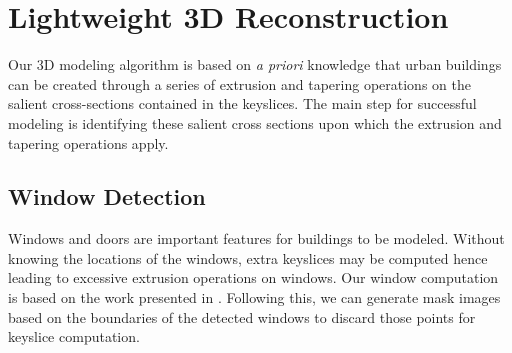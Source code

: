 \documentclass[10pt,twocolumn,letterpaper]{article}
\begin{document}
% 
% 
% 

\section{Lightweight 3D Reconstruction}
\label{sec:reconst}
Our 3D modeling algorithm is based on \emph{a priori} knowledge that
urban buildings can be created through a series of extrusion and tapering
operations on the salient cross-sections contained in the keyslices.
The main step for successful modeling is identifying these salient cross
sections upon which the extrusion and tapering operations apply.

\subsection{Window Detection}
\label{sec:win_detect}
Windows and doors are important features for buildings to be modeled.
Without knowing the locations of the windows, extra keyslices may be computed 
hence leading to excessive extrusion operations on windows.
Our window computation is based on the work presented in \cite{WDD_PV}.
Following this, we can generate mask images based on the boundaries of the
detected windows to discard those points for keyslice computation.
\end{document}
